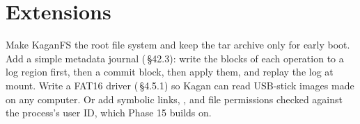 \documentclass[11pt,a4paper]{article}
\begin{document}
\section{Extensions}

Make KaganFS the root file system and keep the tar archive only for early boot. Add a simple metadata journal
(\OSTEP\,\S42.3): write the blocks of each operation to a log region first, then a commit block, then apply them, and
replay the log at mount. Write a FAT16 driver (\MOS\,\S4.5.1) so Kagan can read USB-stick images made on any
computer. Or add symbolic links, , and file permissions checked against the process's user ID, which
Phase 15 builds on.

\booklegend
\end{document}
